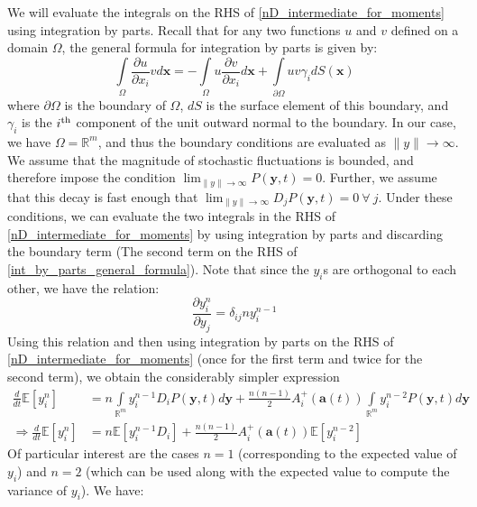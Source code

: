 We will evaluate the integrals on the RHS of \eqref{nD_intermediate_for_moments} using integration by parts. Recall that for any two functions $u$ and $v$ defined on a domain $\Omega$, the general formula for integration by parts is given by:
\begin{equation}
\label{int_by_parts_general_formula}
\int\limits_{\Omega}\frac{\partial u}{\partial x_i}vd\mathbf{x} = -\int\limits_{\Omega}u\frac{\partial v}{\partial x_i}d\mathbf{x} + \int\limits_{\partial\Omega}uv\gamma_{i}dS(\mathbf{x})
\end{equation}
where $\partial \Omega$ is the boundary of $\Omega$, $dS$ is the surface element of this boundary, and $\gamma_i$ is the $i\textsuperscript{th}$ component of the unit outward normal to the boundary. In our case, we have $\Omega = \mathbb{R}^m$, and thus the boundary conditions are evaluated as $\|y\| \to \infty$. We assume that the magnitude of stochastic fluctuations is bounded, and therefore impose the condition $\displaystyle \lim_{\|y\| \to \infty}  P(\mathbf{y},t) = 0$. Further, we assume that this decay is fast enough that $\displaystyle \lim_{\|y\| \to \infty}D_jP(\mathbf{y},t) = 0\ \forall \ j$. Under these conditions, we can evaluate the two integrals in the RHS of \eqref{nD_intermediate_for_moments} by using integration by parts and discarding the boundary term (The second term on the RHS of \eqref{int_by_parts_general_formula}). Note that since the $y_i$s are orthogonal to each other, we have the relation:
\begin{equation*}
\frac{\partial y_i ^{n}}{\partial y_j} = \delta_{ij}ny_i^{n-1}
\end{equation*}
Using this relation and then using integration by parts on the RHS of \eqref{nD_intermediate_for_moments} (once for the first term and twice for the second term), we obtain the considerably simpler expression
\begin{align}
\frac{d}{dt}\mathbb{E}[y_i^n] &= n\int\limits_{\mathbb{R}^m} y_i^{n-1}D_{i}P(\mathbf{y},t)d\mathbf{y} + \frac{n(n-1)}{2}A_i^+(\mathbf{a}(t))\int\limits_{\mathbb{R}^m} y_i^{n-2}P(\mathbf{y},t)d\mathbf{y}\\
\Rightarrow \frac{d}{dt}\mathbb{E}[y_i^n] &= n\mathbb{E}[y_i^{n-1}D_{i}]+\frac{n(n-1)}{2}A_i^+(\mathbf{a}(t))\mathbb{E}[y_i^{n-2}]\label{nD_general_moment_eqns}
\end{align}
Of particular interest are the cases $n=1$ (corresponding to the expected value of $y_i$) and $n=2$ (which can be used along with the expected value to compute the variance of $y_i$). We have:
